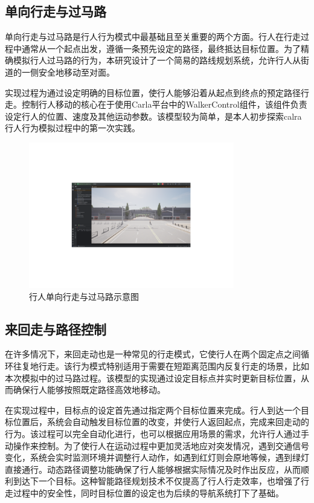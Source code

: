 \subsection{单向行走与过马路}
单向行走与过马路是行人行为模式中最基础且至关重要的两个方面。行人在行走过程中通常从一个起点出发，遵循一条预先设定的路径，最终抵达目标位置。为了精确模拟行人过马路的行为，本研究设计了一个简易的路线规划系统，允许行人从街道的一侧安全地移动至对面。

实现过程为通过设定明确的目标位置，使行人能够沿着从起点到终点的预定路径行走。控制行人移动的核心在于使用Carla平台中的WalkerControl组件，该组件负责设定行人的位置、速度及其他运动参数。该模型较为简单，是本人初步探索calra行人行为模拟过程中的第一次实践。

\begin{figure}[H]
    \centering
    \includegraphics[width=0.8\textwidth]{images/crossing_path.pdf}
    \caption{行人单向行走与过马路示意图}
    \label{f.crossing_path}
\end{figure}

\subsection{来回走与路径控制}
在许多情况下，来回走动也是一种常见的行走模式，它使行人在两个固定点之间循环往复地行走。该行为模式特别适用于需要在短距离范围内反复行走的场景，比如本次模拟中的过马路过程。该模型的实现通过设定目标点并实时更新目标位置，从而确保行人能够按照既定路径高效地移动。

在实现过程中，目标点的设定首先通过指定两个目标位置来完成。行人到达一个目标位置后，系统会自动触发目标位置的改变，并使行人返回起点，完成来回走动的行为。该过程可以完全自动化进行，也可以根据应用场景的需求，允许行人通过手动操作来控制。为了使行人在运动过程中更加灵活地应对突发情况，遇到交通信号变化，系统会实时监测环境并调整行人动作，如遇到红灯则会原地等候，遇到绿灯直接通行。动态路径调整功能确保了行人能够根据实际情况及时作出反应，从而顺利到达下一个目标。这种智能路径规划技术不仅提高了行人行走效率，也增强了行走过程中的安全性，同时目标位置的设定也为后续的导航系统打下了基础。

